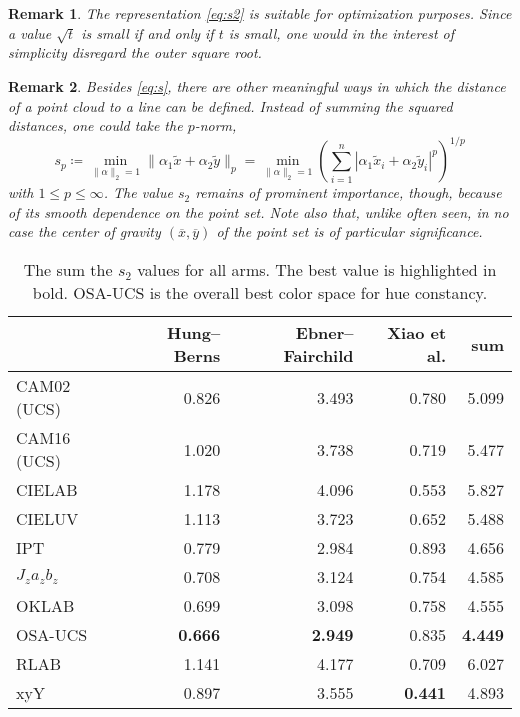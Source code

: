 \documentclass{scrartcl}
\newtheorem*{remark}{Remark}
\theoremstyle{named}
\begin{document}
\begin{remark}
  The representation \eqref{eq:s2} is suitable for optimization purposes. Since a value
  $\sqrt{t}$ is small if and only if $t$ is small, one would in the interest of
  simplicity disregard the outer square root.
\end{remark}

\begin{remark}
Besides \eqref{eq:s}, there are other meaningful ways in which the distance of a point
cloud to a line can be defined. Instead of summing the squared distances, one could take
the $p$-norm,
\[
s_p
  \coloneqq \min_{\|\alpha\|_2=1} \|\alpha_1 \tilde{x} + \alpha_2\tilde{y}\|_p
= \min_{\|\alpha\|_2=1}
  \left(\sum_{i=1}^n |\alpha_1 \tilde{x}_i + \alpha_2 \tilde{y}_i|^p\right)^{1/p}
\]
  with $1\le p \le \infty$.
  The value $s_2$ remains of prominent importance, though, because of its smooth
  dependence on the point set.
  Note also that, unlike often seen, in no case the center of gravity $(\overline{x},
  \overline{y})$ of the point set is of particular significance.
\end{remark}


\begin{table}
  \centering
  \begin{tabular}{lrrrr}
    \toprule
    & Hung--Berns & Ebner--Fairchild & Xiao et al. & sum\\
    \midrule
CAM02 (UCS)   &         0.826  &         3.493  &         0.780  &         5.099\\
CAM16 (UCS)   &         1.020  &         3.738  &         0.719  &         5.477\\
CIELAB        &         1.178  &         4.096  &         0.553  &         5.827\\
CIELUV        &         1.113  &         3.723  &         0.652  &         5.488\\
IPT           &         0.779  &         2.984  &         0.893  &         4.656\\
$J_z a_z b_z$ &         0.708  &         3.124  &         0.754  &         4.585\\
OKLAB         &         0.699  &         3.098  &         0.758  &         4.555\\
OSA-UCS       & \textbf{0.666} & \textbf{2.949} &         0.835  & \textbf{4.449}\\
RLAB          &         1.141  &         4.177  &         0.709  &         6.027\\
xyY           &         0.897  &         3.555  & \textbf{0.441} &         4.893\\
    \bottomrule
  \end{tabular}
  \caption{The sum the $s_2$ values for all arms. The best value is highlighted in bold.
  OSA-UCS is the overall best color space for hue constancy.}
\end{table}
\end{document}
